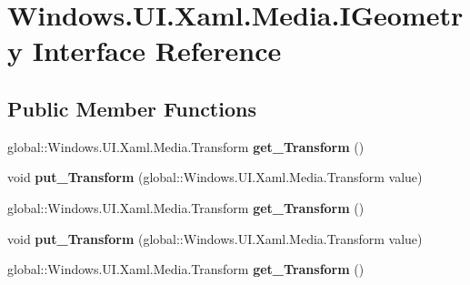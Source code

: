 \hypertarget{interface_windows_1_1_u_i_1_1_xaml_1_1_media_1_1_i_geometry}{}\section{Windows.\+U\+I.\+Xaml.\+Media.\+I\+Geometry Interface Reference}
\label{interface_windows_1_1_u_i_1_1_xaml_1_1_media_1_1_i_geometry}
\subsection*{Public Member Functions}
\begin{DoxyCompactItemize}
\item 
\mbox{\label{interface_windows_1_1_u_i_1_1_xaml_1_1_media_1_1_i_geometry_a3c5b0dedb8823e2206458fd4b6b4106c}} 
global\+::\+Windows.\+U\+I.\+Xaml.\+Media.\+Transform {\bfseries get\+\_\+\+Transform} ()
\item 
\mbox{\label{interface_windows_1_1_u_i_1_1_xaml_1_1_media_1_1_i_geometry_a8e433ab6b71855a6e52aa253679badb2}} 
void {\bfseries put\+\_\+\+Transform} (global\+::\+Windows.\+U\+I.\+Xaml.\+Media.\+Transform value)
\item 
\mbox{\label{interface_windows_1_1_u_i_1_1_xaml_1_1_media_1_1_i_geometry_a3c5b0dedb8823e2206458fd4b6b4106c}} 
global\+::\+Windows.\+U\+I.\+Xaml.\+Media.\+Transform {\bfseries get\+\_\+\+Transform} ()
\item 
\mbox{\label{interface_windows_1_1_u_i_1_1_xaml_1_1_media_1_1_i_geometry_a8e433ab6b71855a6e52aa253679badb2}} 
void {\bfseries put\+\_\+\+Transform} (global\+::\+Windows.\+U\+I.\+Xaml.\+Media.\+Transform value)
\item 
\mbox{\label{interface_windows_1_1_u_i_1_1_xaml_1_1_media_1_1_i_geometry_a3c5b0dedb8823e2206458fd4b6b4106c}} 
global\+::\+Windows.\+U\+I.\+Xaml.\+Media.\+Transform {\bfseries get\+\_\+\+Transform} ()
\item 
\mbox{\label{interface_windows_1_1_u_i_1_1_xaml_1_1_media_1_1_i_geometry_a8e433ab6b71855a6e52aa253679badb2}} 

\end{DoxyCompactItemize}
